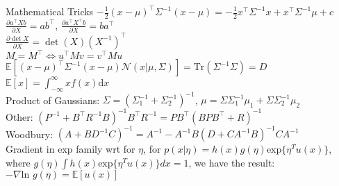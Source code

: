 \documentclass[a4paper,landscape]{amsmlaj}
\makeatletter
\renewcommand{\section}{\@startsection{section}{1}{0mm}
	{-0ex plus -.1ex minus -.5ex}
	{0.1ex plus .7ex}
	{\normalfont\large\bfseries}}
\makeatother
\begin{document}
\begin{multicols*}{3}
\section{Mathematical Tricks}
$-\frac{1}{2}(x-\mu)^\top\Sigma^{-1}(x-\mu) = -\frac{1}{2}x^\top \Sigma^{-1}x +
x^\top \Sigma^{-1} \mu + c$\\
$\frac{\partial a^\top X b}{\partial X} = ab^\top$,
$\frac{\partial a^\top X^\top b}{\partial X} = ba^\top$\\
$\frac{\partial \det X}{\partial X} = \det (X) (X^{-1})^\top$ \\
$M = M^\top \iff u^\top M v = v^\top M u$\\
$\mathbb{E}[(x-\mu)^\top \Sigma^{-1} (x-\mu)\mathcal{N}(x|\mu, \Sigma)] =
\mathrm{Tr}(\Sigma^{-1}\Sigma) = D$\\
$\mathbb{E} [x] = \int^\infty_{-\infty}x f(x)\mathrm{d}x$\\
Product of Gaussians: $\Sigma = (\Sigma_1^{-1} + \Sigma_2^{-1})^{-1}$, $\mu =
\Sigma \Sigma_1^{-1} \mu_1 + \Sigma \Sigma_2^{-1} \mu_2$\\
Other: $(P^{-1}+B^\top R^{-1}B)^{-1}B^\top R^{-1} = PB^\top (BPB^\top +
R)^{-1}$\\
Woodbury: $(A+BD^{-1}C)^{-1} = A^{-1} - A^{-1}B(D+CA^{-1}B)^{-1}CA^{-1}$\\
Gradient in exp family wrt for $\eta$, for $p(x|\eta) =
h(x)g(\eta)\text{exp}\{\eta^Tu(x)\}$, where $g(\eta)\int h(x)
\text{exp}\{\eta^Tu(x)\} dx = 1$, we have the result:$- \nabla \text{ln }
g(\eta) = \mathbb{E}[u(x)]$


\end{multicols*}
\end{document}
